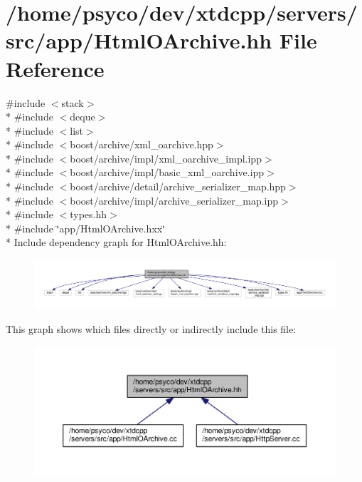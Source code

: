 \hypertarget{HtmlOArchive_8hh}{}\section{/home/psyco/dev/xtdcpp/servers/src/app/\+Html\+O\+Archive.hh File Reference}
\label{HtmlOArchive_8hh}
{\ttfamily \#include $<$stack$>$}\\*
{\ttfamily \#include $<$deque$>$}\\*
{\ttfamily \#include $<$list$>$}\\*
{\ttfamily \#include $<$boost/archive/xml\+\_\+oarchive.\+hpp$>$}\\*
{\ttfamily \#include $<$boost/archive/impl/xml\+\_\+oarchive\+\_\+impl.\+ipp$>$}\\*
{\ttfamily \#include $<$boost/archive/impl/basic\+\_\+xml\+\_\+oarchive.\+ipp$>$}\\*
{\ttfamily \#include $<$boost/archive/detail/archive\+\_\+serializer\+\_\+map.\+hpp$>$}\\*
{\ttfamily \#include $<$boost/archive/impl/archive\+\_\+serializer\+\_\+map.\+ipp$>$}\\*
{\ttfamily \#include $<$types.\+hh$>$}\\*
{\ttfamily \#include \char`\"{}app/\+Html\+O\+Archive.\+hxx\char`\"{}}\\*
Include dependency graph for Html\+O\+Archive.\+hh\+:
\nopagebreak
\begin{figure}[H]
\begin{center}
\leavevmode
\includegraphics[width=350pt]{HtmlOArchive_8hh__incl}
\end{center}
\end{figure}
This graph shows which files directly or indirectly include this file\+:
\nopagebreak
\begin{figure}[H]
\begin{center}
\leavevmode
\includegraphics[width=350pt]{HtmlOArchive_8hh__dep__incl}
\end{center}
\end{figure}
